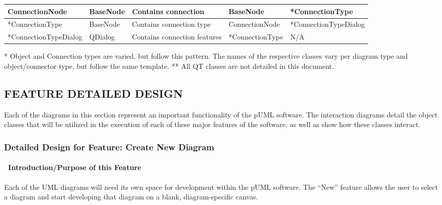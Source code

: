 \documentclass[twoside,letterpaper]{article}
\begin{document}
{\begin{landscape}
\begin{flushleft}
\begin{supertabular}{|m{1.65in}|m{1.0in}|m{3.0in}|m{1.65in}|m{1.65in}|}
    ConnectionNode
  & BaseNode
  & Contains connection
  & BaseNode
  & *ConnectionType
\\\hline

    *ConnectionType 
  & BaseNode
  & Contains connection type
  & ConnectionNode
  & *ConnectionTypeDialog
\\\hline

    *ConnectionTypeDialog
  & QDialog
  & Contains connection features
  & *ConnectionType
  & N/A
\\\hline

\end{supertabular}
\end{flushleft}

{* Object and Connection types are varied, but follow this pattern. \newline
The names of the respective classes vary per diagram type and object/connector type, but follow the same template.
** All QT classes are not detailed in this document.
}



\end{landscape}

\clearpage


\subsection[FEATURE DETAILED DESIGN]
{\bfseries FEATURE DETAILED DESIGN}
{
Each of the diagrams in this section represent an important functionality
of the pUML software.  The interaction diagrams detail the object classes
that will be utilized in the execution of each of these major features of
the software, as well as show how these classes interact.
}


% 
%

\subsubsection{Detailed Design for Feature: Create New Diagram }
\paragraph[\ Introduction/Purpose of this Feature]
{\ Introduction/Purpose of this Feature}
{
Each of the UML diagrams will need its own space for development within the pUML software. The ``New'' feature allows the user to select a diagram and start developing that diagram on a blank, diagram-specific canvas.
}

}
\end{document}
